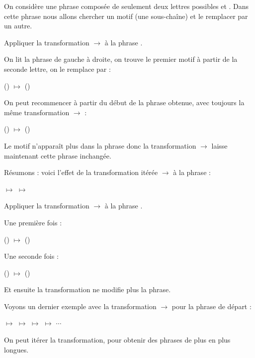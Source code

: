 \documentclass[11pt,class=report,crop=false]{standalone}
\begin{document}
\begin{cours}

On considère une \og{}phrase\fg{} composée de seulement deux lettres possibles 
\rzero{} et \run. Dans cette phrase nous allons chercher un motif (une sous-chaîne) et le remplacer par un autre.

\begin{exemple}
Appliquer la transformation \rzero\run{} $\rightarrow$ \run\rzero{}
à la phrase \run\rzero\run\run\rzero.

On lit la phrase de gauche à droite, on trouve le premier motif \rzero\run{} à partir de la seconde lettre, on le remplace par \run\rzero{} :\\
\centerline{\run(\rzero\run)\run\rzero{} \quad $\longmapsto$ \quad \run(\run\rzero)\run\rzero}

On peut recommencer à partir du début de la phrase obtenue, avec toujours la même transformation  \rzero\run{} $\rightarrow$ \run\rzero{} :\\
\centerline{\run\run(\rzero\run)\rzero{}  \quad $\longmapsto$ \quad \run\run(\run\rzero)\rzero}

Le motif \rzero\run{} n'apparaît plus dans la phrase \run\run\run\rzero\rzero{} donc
la transformation \rzero\run{} $\rightarrow$ \run\rzero{} laisse maintenant cette phrase inchangée.

Résumons : voici l'effet de la transformation itérée \rzero\run{} $\rightarrow$ \run\rzero{} à la phrase \run\rzero\run\run\rzero{} :\\
\centerline{\run\rzero\run\run\rzero{}  \quad $\longmapsto$ \quad \run\run\rzero\run\rzero{} \quad $\longmapsto$ \quad \run\run\run\rzero\rzero}
\end{exemple}

\begin{exemple}
Appliquer la transformation \rzero\rzero\run{} $\rightarrow$ \run\run\rzero\rzero{}
à la phrase \rzero\rzero\run\run.

Une première fois :\\
\centerline{(\rzero\rzero\run)\run{}  \quad $\longmapsto$ \quad (\run\run\rzero\rzero)\run}
Une seconde fois :\\
\centerline{\run\run(\rzero\rzero\run)  \quad $\longmapsto$ \quad \run\run(\run\run\rzero\rzero)}
Et ensuite la transformation ne modifie plus la phrase.
\end{exemple}

\begin{exemple}
Voyons un dernier exemple avec la transformation \rzero\run{} $\rightarrow$ \run\run\rzero\rzero{} pour la phrase de départ \rzero\rzero\rzero\run{}: \\
\centerline{
\rzero\rzero\rzero\run{} \quad $\longmapsto$ \quad 
\rzero\rzero\run\run\rzero\rzero{} \quad $\longmapsto$ \quad 
\rzero\run\run\rzero\rzero\run\rzero\rzero{} \quad $\longmapsto$ \quad 
\run\run\rzero\rzero\run\rzero\rzero\run\rzero\rzero{} \quad $\longmapsto$ \quad $\cdots$}

On peut itérer la transformation, pour obtenir des phrases de plus en plus longues.
\end{exemple}


\end{cours}
\end{document}
